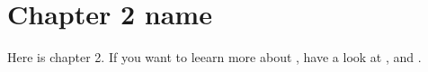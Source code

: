 \setlength{\headheight}{14pt}
\chapter{Chapter 2 name}\label{ch:ch2label}
Here is chapter 2. If you want to leearn  more about \LaTeXe{}, have a look at \cite{Madsen2010}, \cite{Oetiker2010} and \cite{Mittelbach2005}.

